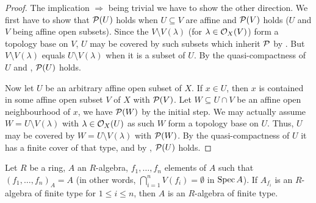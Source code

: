 \documentclass[a4paper,parskip=half,numbers=enddot, DIV=12]{scrreprt}
\begin{document}
\begin{proof}
    The implication  $\Rightarrow$  being trivial we have to show the other direction. We first have to show that $\mathcal{P}(U)$ holds when $U\subseteq V$ are affine and $\mathcal{P}(V)$ holds ($U$ and $V$ being affine open subsets). Since the $V\setminus V(\lambda)$ (for $\lambda\in \mathcal{O}_X(V)$) form a topology base on $V$, $U$ may be covered by such subsets which inherit $\mathcal{P}$ by \itememph{\alpha}. But $V\setminus V(\lambda)$ equals $U\setminus V(\lambda)$ when it is a subset of $U$. By the quasi-compactness of $U$ and \itememph{\beta}, $\mathcal{P}(U)$ holds. 
    
    Now let $U$ be an arbitrary affine open subset of $X$. If $x\in U$, then $x$ is contained in some affine open subset $V$ of $X$ with $\mathcal{P}(V)$. Let $W\subseteq U\cap V$ be an affine open neighbourhood of $x$, we have $\mathcal{P}(W)$ by the initial step. We may actually assume $W=U\setminus V(\lambda)$ with $\lambda\in \mathcal{O}_X(U)$ as such $W$ form a topology base on $U$. Thus, $U$ may be covered by $W=U\setminus V(\lambda)$ with $\mathcal{P}(W)$. By the quasi-compactness of $U$ it has a finite cover of that type, and by \itememph{\beta}, $\mathcal{P}(U)$ holds.
\end{proof}
\begin{lem}
    Let $R$ be a ring, $A$ an $R$-algebra, $f_1,\ldots,f_n$ elements of $A$ such that $(f_1,\ldots, f_n)_A = A$ (in other words, $\bigcap_{i=1}^n V(f_i) =\emptyset$ in $\operatorname{Spec} A$). If $A_{f_i}$ is an $R$-algebra of finite type for $1\leq i\leq n$, then $A$ is an $R$-algebra of finite type.
\end{lem}
\end{document}
